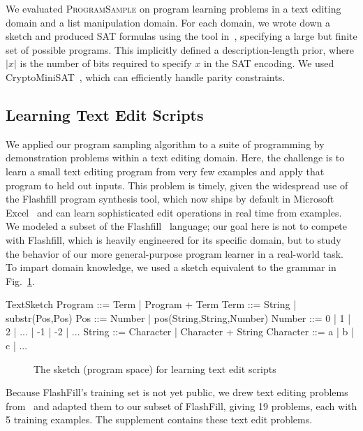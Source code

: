 \documentclass{article}
\newcommand{\theSystem}{\textsc{ProgramSample}}
\begin{document}
  We evaluated \theSystem{} on program learning problems in a text editing domain and a list manipulation domain.
  For each domain, we wrote down a sketch and produced SAT formulas using the tool in~\cite{solar2006combinatorial}, specifying a large but finite set of possible programs.
  This implicitly defined a description-length prior, where $\lvert x \rvert $ is the number of bits required to specify $x$ in the SAT encoding.
We used   CryptoMiniSAT~\cite{crypto}, which can efficiently handle parity constraints.
  

\subsection{Learning Text Edit Scripts}
We applied our program sampling algorithm to a suite of programming by
demonstration problems within a text editing domain.  Here, the
challenge is to learn a small text editing program from very few
examples and apply that program to held out inputs.  This problem is
timely, given the widespread use of the Flashfill program synthesis
tool, which now ships by default in Microsoft Excel~\cite{real_world}
and can learn sophisticated edit operations in real time from
examples.  We modeled a subset of the
Flashfill~\cite{Gulwani:2011:ASP:1926385.1926423} language; our goal
here is not to compete with Flashfill, which is heavily engineered for
its specific domain, but to study the behavior of our more
general-purpose program learner in a real-world task.  To impart
domain knowledge, we used a sketch equivalent to the grammar in Fig.~\ref{textGrammar}.

\begin{SaveVerbatim}[]{TextSketch}
Program ::= Term | Program + Term
Term    ::= String | substr(Pos,Pos)
Pos     ::= Number
         |  pos(String,String,Number)
Number  ::= 0 | 1 | 2 | ... 
         | -1 | -2 | ...
String  ::= Character 
         |  Character + String
Character ::= a | b | c | ...
\end{SaveVerbatim}

\begin{figure}\centering
  \caption{The sketch (program space) for learning text edit scripts}\label{textGrammar}
\end{figure}

Because FlashFill's training set is not yet public, we drew text editing problems from~\cite{DBLP:conf/ecai/LinDETM14} and adapted them to our subset of FlashFill, giving 19 problems, each with 5 training examples.
The supplement contains these text edit problems.
\end{document}
